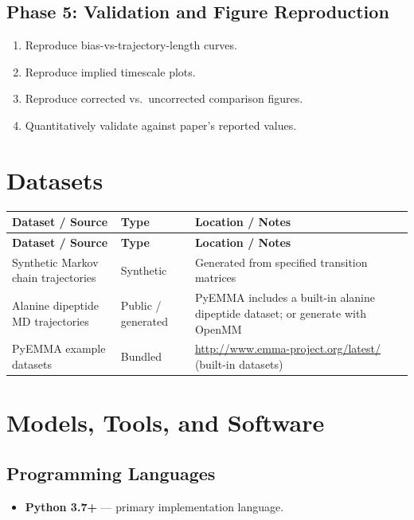 \documentclass[11pt,a4paper]{article}
\begin{document}
\subsection{Phase 5: Validation and Figure Reproduction}
\begin{enumerate}[label=\textbf{5.\arabic*}]
  \item Reproduce bias-vs-trajectory-length curves.
  \item Reproduce implied timescale plots.
  \item Reproduce corrected vs.\ uncorrected comparison figures.
  \item Quantitatively validate against paper's reported values.
\end{enumerate}

\section{Datasets}

\begin{longtable}{p{4.5cm} p{3.5cm} p{6cm}}
\toprule
\textbf{Dataset / Source} & \textbf{Type} & \textbf{Location / Notes} \\
\midrule
\endfirsthead
\toprule
\textbf{Dataset / Source} & \textbf{Type} & \textbf{Location / Notes} \\
\midrule
\endhead
Synthetic Markov chain trajectories & Synthetic & Generated from specified transition matrices \\
\midrule
Alanine dipeptide MD trajectories & Public / generated & PyEMMA includes a built-in alanine dipeptide dataset; or generate with OpenMM \\
\midrule
PyEMMA example datasets & Bundled & \url{http://www.emma-project.org/latest/} (built-in datasets) \\
\bottomrule
\end{longtable}

\section{Models, Tools, and Software}

\subsection{Programming Languages}
\begin{itemize}
  \item \textbf{Python 3.7+} --- primary implementation language.
\end{itemize}
\end{document}
